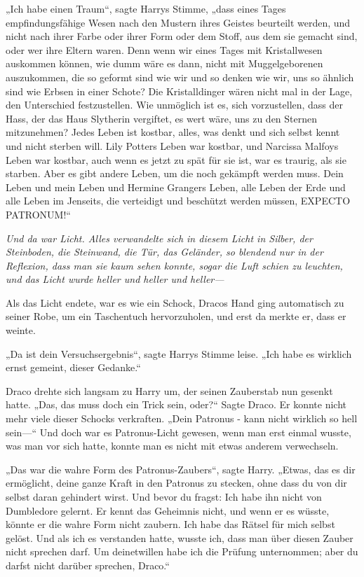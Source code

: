 {„Ich habe einen Traum“, sagte Harrys Stimme, „dass eines Tages empfindungsfähige Wesen nach den Mustern ihres Geistes beurteilt werden, und nicht nach ihrer Farbe oder ihrer Form oder dem Stoff, aus dem sie gemacht sind, oder wer ihre Eltern waren. Denn wenn wir eines Tages mit Kristallwesen auskommen können, wie dumm wäre es dann, nicht mit Muggelgeborenen auszukommen, die so geformt sind wie wir und so denken wie wir, uns so ähnlich sind wie Erbsen in einer Schote? Die Kristalldinger wären nicht mal in der Lage, den Unterschied festzustellen. Wie unmöglich ist es, sich vorzustellen, dass der Hass, der das Haus Slytherin vergiftet, es wert wäre, uns zu den Sternen mitzunehmen? Jedes Leben ist kostbar, alles, was denkt und sich selbst kennt und nicht sterben will. Lily Potters Leben war kostbar, und Narcissa Malfoys Leben war kostbar, auch wenn es jetzt zu spät für sie ist, war es traurig, als sie starben. Aber es gibt andere Leben, um die noch gekämpft werden muss. Dein Leben und mein Leben und Hermine Grangers Leben, alle Leben der Erde und alle Leben im Jenseits, die verteidigt und beschützt werden müssen, EXPECTO PATRONUM!“

\emph{Und da war Licht. Alles verwandelte sich in diesem Licht in Silber, der Steinboden, die Steinwand, die Tür, das Geländer, so blendend nur in der Reflexion, dass man sie kaum sehen konnte, sogar die Luft schien zu leuchten, und das Licht wurde heller und heller und heller—}

Als das Licht endete, war es wie ein Schock, Dracos Hand ging automatisch zu seiner Robe, um ein Taschentuch hervorzuholen, und erst da merkte er, dass er weinte.

„Da ist dein Versuchsergebnis“, sagte Harrys Stimme leise. „Ich habe es wirklich ernst gemeint, dieser Gedanke.“

Draco drehte sich langsam zu Harry um, der seinen Zauberstab nun gesenkt hatte. „Das, das muss doch ein Trick sein, oder?“ Sagte Draco. Er konnte nicht mehr viele dieser Schocks verkraften. „Dein Patronus - kann nicht wirklich so hell sein—“ Und doch war es Patronus-Licht gewesen, wenn man erst einmal wusste, was man vor sich hatte, konnte man es nicht mit etwas anderem verwechseln.

„Das war die wahre Form des Patronus-Zaubers“, sagte Harry. „Etwas, das es dir ermöglicht, deine ganze Kraft in den Patronus zu stecken, ohne dass du von dir selbst daran gehindert wirst. Und bevor du fragst: Ich habe ihn nicht von Dumbledore gelernt. Er kennt das Geheimnis nicht, und wenn er es wüsste, könnte er die wahre Form nicht zaubern. Ich habe das Rätsel für mich selbst gelöst. Und als ich es verstanden hatte, wusste ich, dass man über diesen Zauber nicht sprechen darf. Um deinetwillen habe ich die Prüfung unternommen; aber du darfst nicht darüber sprechen, Draco.“

}
